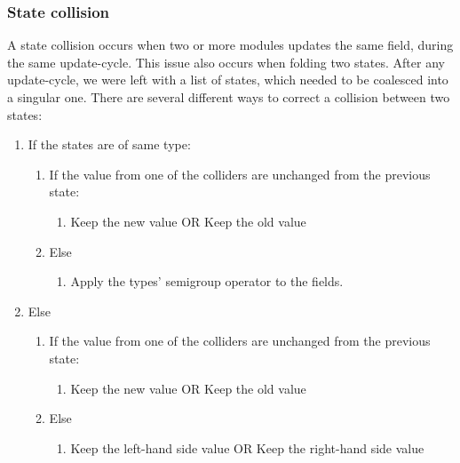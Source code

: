 \subsubsection{State collision} \label{sec:collision}

A state collision occurs when two or more modules updates the same field, during
the same update-cycle. This issue also occurs when folding two states. After any
update-cycle, we were left with a list of states, which needed to be coalesced
into a singular one. There are several different ways to correct a collision
between two states:

\begin{enumerate}
  \item If the states are of same type:
    \begin{enumerate}
      \item If the value from one of the colliders are unchanged from the previous state:
        \begin{enumerate}
          \item Keep the new value OR Keep the old value
        \end{enumerate}
      \item Else
        \begin{enumerate}
          \item Apply the types' semigroup operator to the fields.
        \end{enumerate}
    \end{enumerate}
  \item Else
    \begin{enumerate}
      \item If the value from one of the colliders are unchanged from the previous state:
        \begin{enumerate}
          \item Keep the new value OR Keep the old value
        \end{enumerate}
      \item Else
        \begin{enumerate}
          \item Keep the left-hand side value OR Keep the right-hand side value
        \end{enumerate}
    \end{enumerate}
\end{enumerate}

